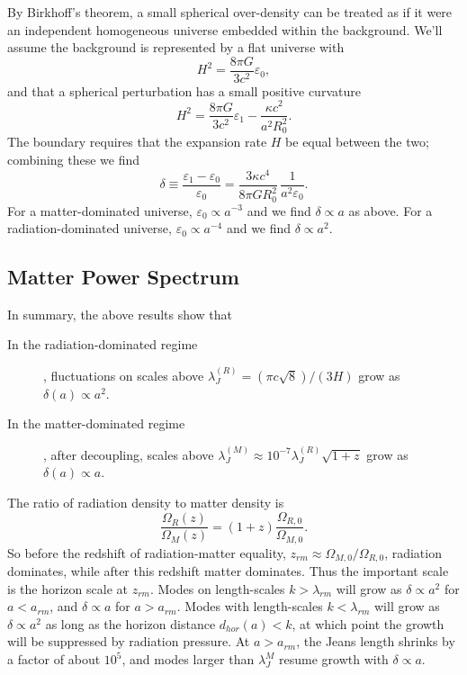 By Birkhoff's theorem, a small spherical over-density can be treated as if
it were an independent homogeneous universe embedded within the background.
We'll assume the background is represented by a flat universe with
\begin{equation}
  H^2 = \frac{8\pi G}{3c^2}\varepsilon_0,
\end{equation}
and that a spherical perturbation has a small positive curvature
\begin{equation}
  H^2 = \frac{8\pi G}{3c^2}\varepsilon_1 - \frac{\kappa c^2}{a^2R_0^2}.
\end{equation}
The boundary requires that the expansion rate $H$ be equal between the
two; combining these we find
\begin{equation}
  \delta \equiv \frac{\varepsilon_1 - \varepsilon_0}{\varepsilon_0}
  = \frac{3\kappa c^4}{8\pi G R_0^2}\,\frac{1}{a^2 \varepsilon_0}.
\end{equation}
For a matter-dominated universe, $\varepsilon_0 \propto a^{-3}$
and we find $\delta \propto a$ as above.
For a radiation-dominated universe, $\varepsilon_0 \propto a^{-4}$
and we find $\delta \propto a^2$.

\subsection{Matter Power Spectrum}
In summary, the above results show that
\begin{description}
  \item[In the radiation-dominated regime], fluctuations on scales above
    $\lambda_J^{(R)} = (\pi c \sqrt{8})/(3 H)$ grow as
    $\delta(a) \propto a^2$.
  \item[In the matter-dominated regime], after decoupling, scales above
    $\lambda_J^{(M)}\approx 10^{-7} \lambda_J^{(R)} \sqrt{1 + z}$
    grow as $\delta(a) \propto a$.
\end{description}
The ratio of radiation density to matter density is
\begin{equation}
  \frac{\Omega_R(z)}{\Omega_M(z)} = (1 + z)\frac{\Omega_{R,0}}{\Omega_{M,0}}.
\end{equation}
So before the redshift of radiation-matter equality,
$z_{rm} \approx \Omega_{M,0}/\Omega_{R,0}$, radiation
dominates, while after this redshift matter dominates.
Thus the important scale is the horizon scale at $z_{rm}$.
Modes on length-scales $k > \lambda_{rm}$ will grow as $\delta \propto a^2$
for $a < a_{rm}$, and $\delta \propto a$ for $a > a_{rm}$.  Modes with
length-scales $k < \lambda_{rm}$ will grow as $\delta \propto a^2$ as long
as the horizon distance $d_{hor}(a) < k$, at which point the growth will
be suppressed by radiation pressure.  At $a > a_{rm}$, the Jeans length
shrinks by a factor of about $10^5$, and modes larger than $\lambda_J^{M}$
resume growth with $\delta \propto a$.

